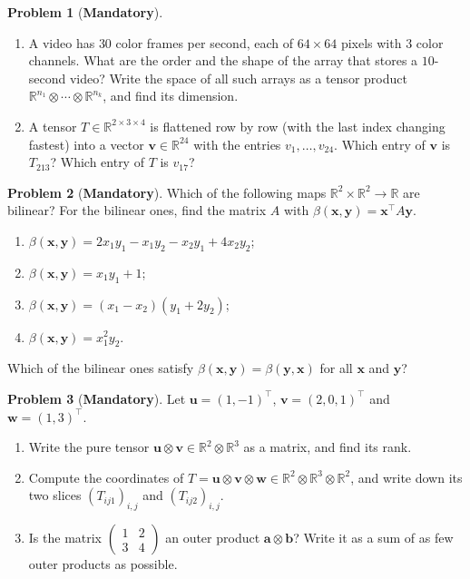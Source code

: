 \documentclass[11pt]{article}
\theoremstyle{definition}
\newtheorem{problem}{Problem}[section]
\newcommand{\mandatory}{\textcolor{red!70!black}{\textbf{Mandatory}}}
\begin{document}
\begin{problem}[\mandatory]\label{pr:tensor-shapes}
    \begin{enumerate}[label=(\alph*)]
        \item A video has $30$ color frames per second, each of $64 \times 64$ pixels with $3$ color channels. What are the order and the shape of the array that stores a $10$-second video? Write the space of all such arrays as a tensor product $\mathbb{R}^{n_1} \otimes \cdots \otimes \mathbb{R}^{n_k}$, and find its dimension.
        \item A tensor $T \in \mathbb{R}^{2 \times 3 \times 4}$ is flattened row by row (with the last index changing fastest) into a vector $\mathbf{v} \in \mathbb{R}^{24}$ with the entries $v_1, \ldots, v_{24}$. Which entry of $\mathbf{v}$ is $T_{213}$? Which entry of $T$ is $v_{17}$?
    \end{enumerate}
\end{problem}

\begin{problem}[\mandatory]\label{pr:bilinear-practice}
    Which of the following maps $\mathbb{R}^2 \times \mathbb{R}^2 \to \mathbb{R}$ are bilinear? For the bilinear ones, find the matrix $A$ with $\beta(\mathbf{x}, \mathbf{y}) = \mathbf{x}^\top A\mathbf{y}$.
    \begin{enumerate}[label=(\alph*)]
        \item $\beta(\mathbf{x}, \mathbf{y}) = 2x_1y_1 - x_1y_2 - x_2y_1 + 4x_2y_2$;
        \item $\beta(\mathbf{x}, \mathbf{y}) = x_1y_1 + 1$;
        \item $\beta(\mathbf{x}, \mathbf{y}) = (x_1 - x_2)(y_1 + 2y_2)$;
        \item $\beta(\mathbf{x}, \mathbf{y}) = x_1^2 y_2$.
    \end{enumerate}
    Which of the bilinear ones satisfy $\beta(\mathbf{x}, \mathbf{y}) = \beta(\mathbf{y}, \mathbf{x})$ for all $\mathbf{x}$ and $\mathbf{y}$?
\end{problem}

\begin{problem}[\mandatory]\label{pr:outer-practice}
    Let $\mathbf{u} = (1, -1)^\top$, $\mathbf{v} = (2, 0, 1)^\top$ and $\mathbf{w} = (1, 3)^\top$.
    \begin{enumerate}[label=(\alph*)]
        \item Write the pure tensor $\mathbf{u} \otimes \mathbf{v} \in \mathbb{R}^2 \otimes \mathbb{R}^3$ as a matrix, and find its rank.
        \item Compute the coordinates of $T = \mathbf{u} \otimes \mathbf{v} \otimes \mathbf{w} \in \mathbb{R}^2 \otimes \mathbb{R}^3 \otimes \mathbb{R}^2$, and write down its two slices $(T_{ij1})_{i,j}$ and $(T_{ij2})_{i,j}$.
        \item Is the matrix $\begin{pmatrix} 1 & 2 \\ 3 & 4 \end{pmatrix}$ an outer product $\mathbf{a} \otimes \mathbf{b}$? Write it as a sum of as few outer products as possible.
    \end{enumerate}
\end{problem}
\end{document}
